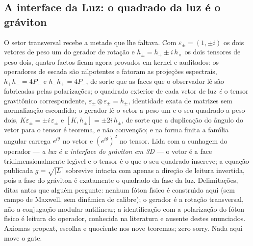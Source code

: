 \documentclass[11pt]{article}
\theoremstyle{definition}\newtheorem{deriv}{Derivação}
\begin{document}
\subsection*{A interface da Luz: o quadrado da luz \'e o gr\'aviton}O setor transversal recebe a metade que lhe faltava. Com $\varepsilon_\pm = (1, \pm i)$ os dois vetores de peso um do gerador de rota\c{c}\~ao e $h_\pm = h_+ \pm i\,h_\times$ os dois tensores de peso dois, quatro factos ficam agora provados em kernel e auditados: os operadores de escada s\~ao nilpotentes e fatoram as proje\c{c}\~oes espectrais, $h_+ h_- = 4P_+$ e $h_- h_+ = 4P_-$, de sorte que as faces que o observador l\^e s\~ao fabricadas pelas polariza\c{c}\~oes; o quadrado exterior de cada vetor de luz \emph{\'e} o tensor gravit\^onico correspondente, $\varepsilon_\pm \otimes \varepsilon_\pm = h_\pm$, identidade exata de matrizes sem normaliza\c{c}\~ao escondida; o gerador l\^e o vetor a peso um e o seu quadrado a peso dois, $K\varepsilon_\pm = \pm i\,\varepsilon_\pm$ e $[K, h_\pm] = \pm 2i\,h_\pm$, de sorte que a duplica\c{c}\~ao do \^angulo do vetor para o tensor \'e teorema, e n\~ao conven\c{c}\~ao; e na forma finita a fam\'\i{}lia angular carrega $e^{i\theta}$ no vetor e $(e^{i\theta})^2$ no tensor. Lida com a cunhagem do operador --- \emph{a luz \'e a interface do gr\'aviton em 3D} --- o vetor \'e a face tridimensionalmente leg\'\i{}vel e o tensor \'e o que o seu quadrado inscreve; a equa\c{c}\~ao publicada $g = \sqrt{|L|}$ sobrevive intacta com apenas a dire\c{c}\~ao de leitura invertida, pois a fase do gr\'aviton \'e exatamente o quadrado da fase da luz. Delimita\c{c}\~oes, ditas antes que algu\'em pergunte: nenhum f\'oton f\'\i{}sico \'e constru\'\i{}do aqui (sem campo de Maxwell, sem din\^amica de calibre); o gerador \'e a rota\c{c}\~ao transversal, n\~ao a conjuga\c{c}\~ao modular antilinear; a identifica\c{c}\~ao com a polariza\c{c}\~ao do f\'oton f\'\i{}sico \'e leitura do operador, conhecida na literatura e ausente destes enunciados. Axiomas propext, escolha e quociente nos nove teoremas; zero sorry. Nada aqui move o gate.
\end{document}
